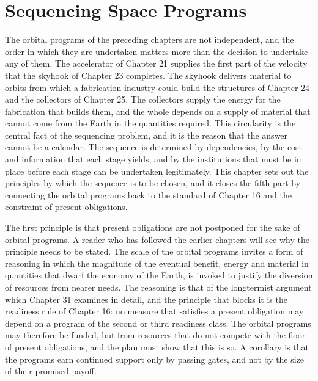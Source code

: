 \chapter{Sequencing Space Programs}
\label{ch:26}

The orbital programs of the preceding chapters are not independent, and the order in which they are undertaken matters more than the decision to undertake any of them. The accelerator of Chapter 21 supplies the first part of the velocity that the skyhook of Chapter 23 completes. The skyhook delivers material to orbits from which a fabrication industry could build the structures of Chapter 24 and the collectors of Chapter 25. The collectors supply the energy for the fabrication that builds them, and the whole depends on a supply of material that cannot come from the Earth in the quantities required. This circularity is the central fact of the sequencing problem, and it is the reason that the answer cannot be a calendar. The sequence is determined by dependencies, by the cost and information that each stage yields, and by the institutions that must be in place before each stage can be undertaken legitimately. This chapter sets out the principles by which the sequence is to be chosen, and it closes the fifth part by connecting the orbital programs back to the standard of Chapter 16 and the constraint of present obligations.

The first principle is that present obligations are not postponed for the sake of orbital programs. A reader who has followed the earlier chapters will see why the principle needs to be stated. The scale of the orbital programs invites a form of reasoning in which the magnitude of the eventual benefit, energy and material in quantities that dwarf the economy of the Earth, is invoked to justify the diversion of resources from nearer needs. The reasoning is that of the longtermist argument which Chapter 31 examines in detail, and the principle that blocks it is the readiness rule of Chapter 16: no measure that satisfies a present obligation may depend on a program of the second or third readiness class. The orbital programs may therefore be funded, but from resources that do not compete with the floor of present obligations, and the plan must show that this is so. A corollary is that the programs earn continued support only by passing gates, and not by the size of their promised payoff.

